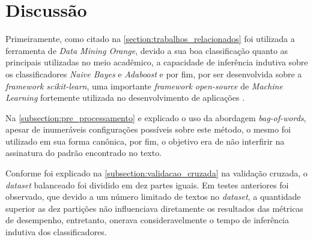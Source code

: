 \section{Discussão}

Primeiramente, como citado na \autoref{section:trabalhos_relacionados} foi 
utilizada a ferramenta de \textit{Data Mining Orange}, devido a sua boa 
classificação quanto as principais utilizadas no meio acadêmico, a capacidade 
de inferência indutiva sobre os classificadores \textit{Naive Bayes} e 
\textit{Adaboost} e por fim, por ser desenvolvida sobre a 
\textit{framework scikit-learn}, uma importante \textit{framework open-source} 
de \textit{Machine Learning} fortemente utilizada no desenvolvimento de 
aplicações \cite{scikit-learn}.

Na \autoref{subsection:pre_processamento} e explicado o uso da abordagem
\textit{bag-of-words}, apesar de inumeráveis configurações possíveis sobre este 
método, o mesmo foi utilizado em sua forma canônica, por fim, o objetivo era de 
não interfirir na assinatura do padrão encontrado no texto.

Conforme foi explicado na \autoref{subsection:validacao_cruzada} na validação 
cruzada, o \textit{dataset} balanceado foi dividido em dez partes iguais. Em 
testes anteriores foi observado, que devido a um número limitado de textos no 
\textit{dataset}, a quantidade superior as dez partições não influenciava 
diretamente os resultados das métricas de desempenho, entretanto, onerava 
consideravelmente o tempo de inferência indutiva dos classificadores.